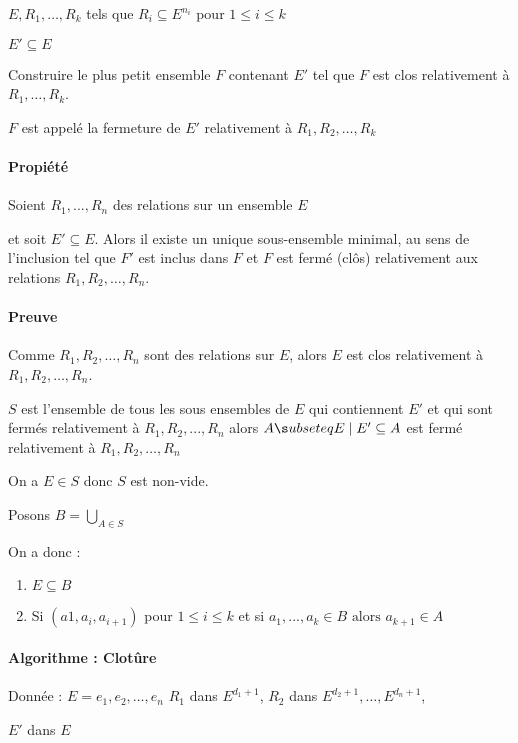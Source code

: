 \documentclass[12pt, a4paper]{report}
\begin{document}
$E, R_1, \dots, R_k$ tels que $R_i \subseteq E^{n_i}$ pour $1 \leq i \leq k$

$E' \subseteq E$

Construire le plus petit ensemble $F$ contenant $E'$ tel que $F$ est clos
relativement à $R_1, \dots, R_k$.

$F$ est appelé la fermeture de $E'$ relativement à $R_1, R_2, \dots, R_k$

\paragraph{Propiété}
Soient $R_1,..., R_n$ des relations sur un ensemble $E$

et soit $E' \subseteq E$. Alors il existe un unique sous-ensemble minimal, au 
sens de l'inclusion tel que $F'$ est inclus dans $F$ et $F$ est fermé (clôs) 
relativement aux relations $R_1, R_2,\dots, R_n$.

\paragraph{Preuve}

Comme $R_1, R_2, \dots, R_n$ sont des relations sur $E$, alors $E$ est clos relativement à
$R_1, R_2, \dots, R_n$.

$S$ est l'ensemble de tous les sous ensembles de $E$ qui contiennent $E'$ et qui sont
fermés relativement à $R_1, R_2, ..., R_n$
alors ${A \s ubseteq E \mid E'\subseteq A}$ est fermé relativement à $R_1, R_2,\dots, R_n$

On a  $E \in S$ donc $S$ est non-vide.

Posons $B = \bigcup_{A\in S}$

On a donc : 
\begin{enumerate}
  \item $E \subseteq B$
  \item %
  Si $(a1, a_i, a_{i+1})$ pour $1 \leq i \leq k$
  et si $a_1, ..., a_k \in B \text{ alors } a_{k+1} \in A$
\end{enumerate}

\paragraph{Algorithme : Clotûre}

Donnée : $E = {e_1, e_2, \dots, e_n}$
$R_1$ dans $E^{d_1+1}$, $R_2$ dans $E^{d_2+1}, \dots, E^{d_n + 1}$,

$E'$ dans $E$
\end{document}
